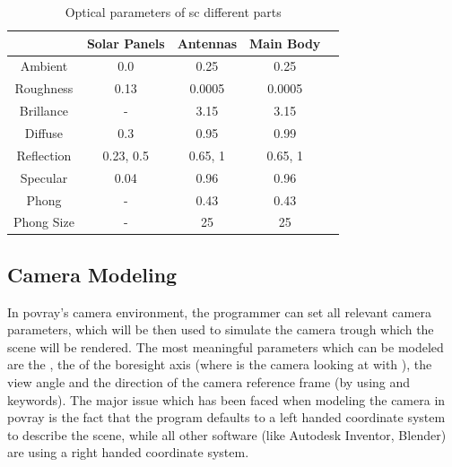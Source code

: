 \begin{table}
  \centering
  \begin{tabular}{c cccc}
    \hline
    \hline
               & Solar Panels & Antennas  & Main Body \\
    \hline
    Ambient    & 0.0          & 0.25      & 0.25      \\
    Roughness  & 0.13         & 0.0005    & 0.0005    \\
    Brillance  & -            & 3.15      & 3.15      \\
    Diffuse    & 0.3          & 0.95      & 0.99      \\
    Reflection & {0.23, 0.5}  & {0.65, 1} & {0.65, 1} \\
    Specular   & 0.04         & 0.96      & 0.96      \\
    Phong      & -            & 0.43      & 0.43      \\
    Phong Size & -            & 25        & 25        \\
    \hline
    \hline
  \end{tabular}
  \caption{Optical parameters of \acrshort{sc} different parts}
  \label{tab:SCParameters}
\end{table}

\subsection{Camera Modeling}
In \acrshort{povray}'s camera environment, the programmer can set all relevant camera parameters, which will be then used to simulate the camera trough which the scene will be rendered.
The most meaningful parameters which can be modeled are the , the  of the boresight axis (where is the
camera looking at with ), the view angle and the direction of the camera reference frame (by using  and  keywords).
The major issue which has been faced when modeling the camera in \acrshort{povray} is the fact that the program defaults to a left handed coordinate system to describe the scene, while all other software (like Autodesk Inventor, Blender) are using a right handed coordinate system.

